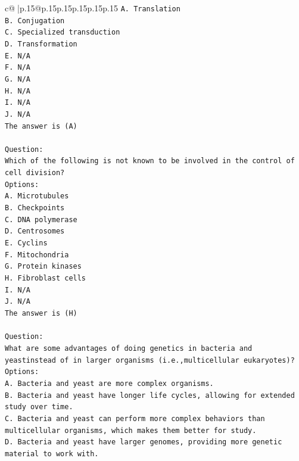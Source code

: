 \documentclass{article}
\begin{document}
{\begin{supertabular}{c@{$\;$}|p{.15\linewidth}@{}p{.15\linewidth}p{.15\linewidth}p{.15\linewidth}p{.15\linewidth}p{.15\linewidth}}
{{{\texttt{A. Translation} \\
\texttt{B. Conjugation} \\
\texttt{C. Specialized transduction} \\
\texttt{D. Transformation} \\
\texttt{E. N/A} \\
\texttt{F. N/A} \\
\texttt{G. N/A} \\
\texttt{H. N/A} \\
\texttt{I. N/A} \\
\texttt{J. N/A} \\
\texttt{The answer is (A)} \\
\\ 
\texttt{Question:} \\
\texttt{Which of the following is not known to be involved in the control of cell division?} \\
\texttt{Options:} \\
\texttt{A. Microtubules} \\
\texttt{B. Checkpoints} \\
\texttt{C. DNA polymerase} \\
\texttt{D. Centrosomes} \\
\texttt{E. Cyclins} \\
\texttt{F. Mitochondria} \\
\texttt{G. Protein kinases} \\
\texttt{H. Fibroblast cells} \\
\texttt{I. N/A} \\
\texttt{J. N/A} \\
\texttt{The answer is (H)} \\
\\ 
\texttt{Question:} \\
\texttt{What are some advantages of doing genetics in bacteria and yeastinstead of in larger organisms (i.e.,multicellular eukaryotes)?} \\
\texttt{Options:} \\
\texttt{A. Bacteria and yeast are more complex organisms.} \\
\texttt{B. Bacteria and yeast have longer life cycles, allowing for extended study over time.} \\
\texttt{C. Bacteria and yeast can perform more complex behaviors than multicellular organisms, which makes them better for study.} \\
\texttt{D. Bacteria and yeast have larger genomes, providing more genetic material to work with.} \\
}}}
\end{supertabular}}
\end{document}

